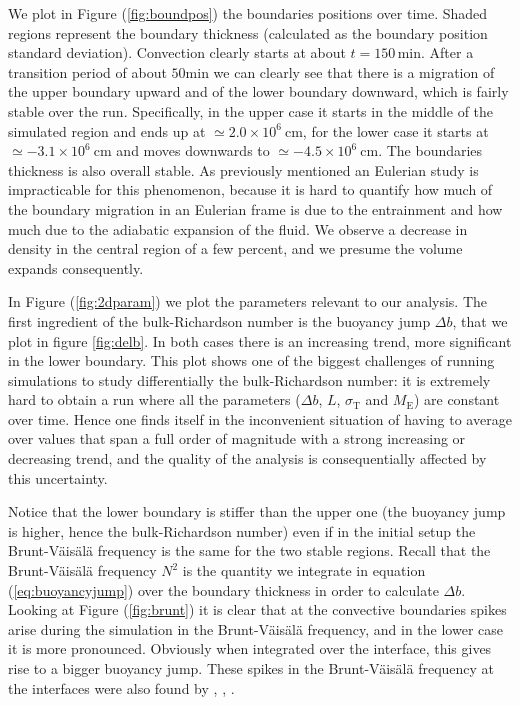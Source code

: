 We plot in Figure (\ref{fig:boundpos}) the boundaries positions over time. Shaded regions represent the boundary thickness (calculated as the boundary position standard deviation). Convection clearly starts at about $t=150 \, \mathrm{min}$. After a transition period of about $50 \mathrm{min}$ we can clearly see that there is a migration of the upper boundary upward and of the lower boundary downward, which is fairly stable over the run. Specifically, in the upper case it starts in the middle of the simulated region and ends up at $\simeq 2.0 \times 10^{6} \ \mathrm{cm}$, for the lower case it starts at $\simeq - 3.1 \times 10^{6} \ \mathrm{cm}$ and moves downwards to $\simeq - 4.5 \times 10^{6} \ \mathrm{cm}$. The boundaries thickness is also overall stable. As previously mentioned an Eulerian study is impracticable for this phenomenon, because it is hard to quantify how much of the boundary migration in an Eulerian frame is due to the entrainment and how much due to the adiabatic expansion of the fluid. We observe a decrease in density in the central region of a few percent, and we presume the volume expands consequently. 

In Figure (\ref{fig:2dparam}) we plot the parameters relevant to our analysis. 
The first ingredient of the bulk-Richardson number is the buoyancy jump $\Delta b$, that we plot in figure \ref{fig:delb}. In both cases there is an increasing trend, more significant in the lower boundary. This plot shows one of the biggest challenges of running simulations to study differentially the bulk-Richardson number: it is extremely hard to obtain a run where all the parameters ($\Delta b$, $L$, $\sigma_{\mathrm{T}}$ and $M_{\mathrm{E}}$) are constant over time. Hence one finds itself in the inconvenient situation of having to average over values that span a full order of magnitude with a strong increasing or decreasing trend, and the quality of the analysis is consequentially affected by this uncertainty. 

Notice that the lower boundary is stiffer than the upper one (the buoyancy jump is higher, hence the bulk-Richardson number) even if in the initial setup the Brunt-Väisälä frequency is the same for the two stable regions. Recall that the Brunt-Väisälä frequency $N^2$ is the quantity we integrate in equation (\ref{eq:buoyancyjump}) over the boundary thickness in order to calculate $\Delta b$. Looking at Figure (\ref{fig:brunt}) it is clear that at the convective boundaries spikes arise during the simulation in the Brunt-Väisälä frequency, and in the lower case it is more pronounced. Obviously when integrated over the interface, this gives rise to a bigger buoyancy jump. These spikes in the Brunt-Väisälä frequency at the interfaces were also found by \citet{viallet2013}, \citet{arnett2015}, \citet{cristini}.

